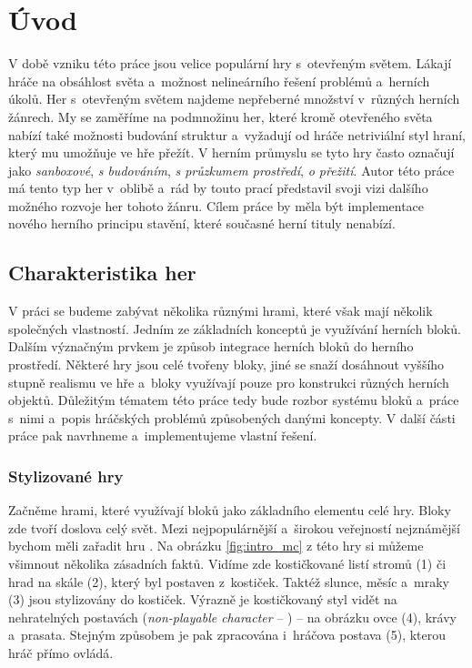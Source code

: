 
\chapter{Úvod}
\label{chap:uvod}

V době vzniku této práce jsou velice populární hry s~otevřeným světem. Lákají hráče na obsáhlost světa a~možnost nelineárního řešení problémů a~herních úkolů. Her s~otevřeným světem najdeme nepřeberné množství v~různých herních žánrech. My se zaměříme na podmnožinu her, které kromě otevřeného světa nabízí také možnosti budování struktur a~vyžadují od hráče netriviální styl hraní, který mu umožňuje ve hře přežít. V herním průmyslu se tyto hry často označují jako \textit{sanboxové}, \textit{s budováním}, \textit{s průzkumem prostředí}, \textit{o přežití}. Autor této práce má tento typ her v~oblibě a~rád by touto prací představil svoji vizi dalšího možného rozvoje her tohoto žánru. Cílem práce by měla být implementace nového herního principu stavění, které současné herní tituly nenabízí.

\section{Charakteristika her}
V práci se budeme zabývat několika různými hrami, které však mají několik společných vlastností. Jedním ze základních konceptů je využívání herních bloků. Dalším význačným prvkem je způsob integrace herních bloků do herního prostředí. Některé hry jsou celé tvořeny bloky, jiné se snaží dosáhnout vyššího stupně realismu ve hře a~bloky využívají pouze pro konstrukci různých herních objektů. Důležitým tématem této práce tedy bude rozbor systému bloků a~práce s~nimi a~popis hráčských problémů způsobených danými koncepty. V další části práce pak navrhneme a~implementujeme vlastní řešení.




\subsection{Stylizované hry}
Začněme hrami, které využívají bloků jako základního elementu celé hry. Bloky zde tvoří doslova celý svět. Mezi nejpopulárnější a~širokou veřejností nejznámější bychom měli zařadit hru \MC{}. Na obrázku \ref{fig:intro_mc} z této hry si můžeme všimnout několika zásadních faktů. Vidíme zde kostičkované listí stromů (1) či hrad na skále (2), který byl postaven z~kostiček. Taktéž slunce, měsíc a~mraky (3) jsou stylizovány do kostiček. Výrazně je kostičkovaný styl vidět na nehratelných postavách (\textit{non-playable character} -- \NPC{}) -- na obrázku ovce (4), krávy a~prasata. Stejným způsobem je pak zpracována i~hráčova postava (5), kterou hráč přímo ovládá.

